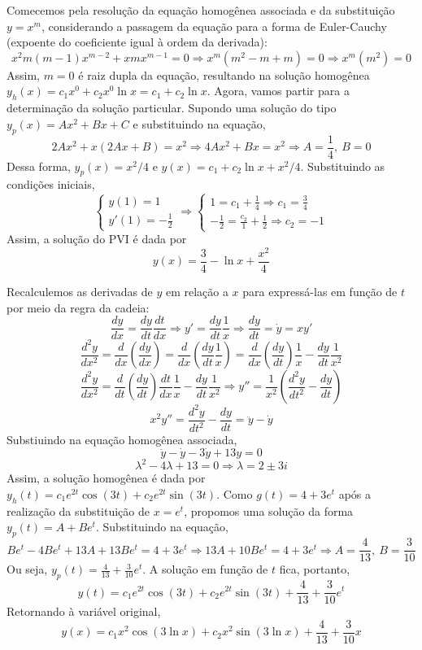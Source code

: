 \documentclass[oneside,12pt,a4paper]{report}
\begin{document}
\begin{resolucao}
    \itemresolucao Comecemos pela resolução da equação homogênea associada e da substituição $y=x^m$, considerando a passagem da equação para a forma de Euler-Cauchy (expoente do coeficiente igual à ordem da derivada):
    \[x^2m(m-1)x^{m-2}+xmx^{m-1}=0\Rightarrow x^m(m^2-m+m)=0\Rightarrow x^m(m^2)=0\]
    Assim, $m=0$ é raiz dupla da equação, resultando na solução homogênea $y_h(x)=c_1x^0+c_2x^0\ln x=c_1+c_2\ln x$. Agora, vamos partir para a determinação da solução particular. Supondo uma solução do tipo $y_p(x)=Ax^2+Bx+C$ e substituindo na equação,
    \[2Ax^2+x(2Ax+B)=x^2\Rightarrow4Ax^2+Bx=x^2\Rightarrow A=\frac{1}{4},~B=0\]
    Dessa forma, $y_p(x)=x^2/4$ e $y(x)=c_1+c_2\ln x+x^2/4$. Substituindo as condições iniciais,
    \begin{equation}
        \begin{cases}
            y(1)=1\\
            y'(1)=-\frac{1}{2}
        \end{cases}\Rightarrow
        \begin{cases}
            1=c_1+\frac{1}{4}\Rightarrow c_1=\frac{3}{4}\\
            -\frac{1}{2}=\frac{c_2}{1}+\frac{1}{2}\Rightarrow c_2=-1
        \end{cases}
    \end{equation}
    Assim, a solução do PVI é dada por
    \[\boxed{y(x)=\frac{3}{4}-\ln x+\frac{x^2}{4}}\]
    
\end{resolucao}

\begin{resolucao}
    Recalculemos as derivadas de $y$ em relação a $x$ para expressá-las em função de $t$ por meio da regra da cadeia:
    \[\frac{dy}{dx}=\frac{dy}{dt}\frac{dt}{dx}\Rightarrow y'=\frac{dy}{dt}\frac{1}{x}\Rightarrow\boxed{\frac{dy}{dt}=\dot{y}=xy'}\]
    \[\frac{d^2y}{dx^2}=\frac{d}{dx}\left(\frac{dy}{dx}\right)=\frac{d}{dx}\left(\frac{dy}{dt}\frac{1}{x}\right)=\frac{d}{dx}\left(\frac{dy}{dt}\right)\frac{1}{x}-\frac{dy}{dt}\frac{1}{x^2}\]
    \[\frac{d^2y}{dx^2}=\frac{d}{dt}\left(\frac{dy}{dt}\right)\frac{dt}{dx}\frac{1}{x}-\frac{dy}{dt}\frac{1}{x^2}\Rightarrow y''=\frac{1}{x^2}\left(\frac{d^2y}{dt^2}-\frac{dy}{dt}\right)\]
    \[\boxed{x^2y''=\frac{d^2y}{dt^2}-\frac{dy}{dt}=\ddot{y}-\dot{y}}\]
    Substiuindo na equação homogênea associada,
    \[\ddot{y}-\dot{y}-3\dot{y}+13y=0\]
    \[\lambda^2-4\lambda+13=0\Rightarrow\lambda=2\pm3i\]
    Assim, a solução homogênea é dada por $y_h(t)=c_1e^{2t}\cos(3t)+c_2e^{2t}\sin(3t)$. Como $g(t)=4+3e^t$ após a realização da substituição de $x=e^t$, propomos uma solução da forma $y_p(t)=A + Be^t$. Substituindo na equação,
    \[Be^t-4Be^t+13A+13Be^t=4+3e^t\Rightarrow 13A+10Be^t=4+3e^t\Rightarrow A=\frac{4}{13},~B=\frac{3}{10}\]
    Ou seja, $y_p(t)=\frac{4}{13}+\frac{3}{10}e^t$. A solução em função de $t$ fica, portanto,
    \[y(t)=c_1e^{2t}\cos(3t)+c_2e^{2t}\sin(3t)+\frac{4}{13}+\frac{3}{10}e^t\]
    Retornando à variável original,
    \[\boxed{y(x)=c_1x^2\cos(3\ln x)+c_2x^2\sin(3\ln x)+\frac{4}{13}+\frac{3}{10}x}\]
\end{resolucao}
\end{document}
